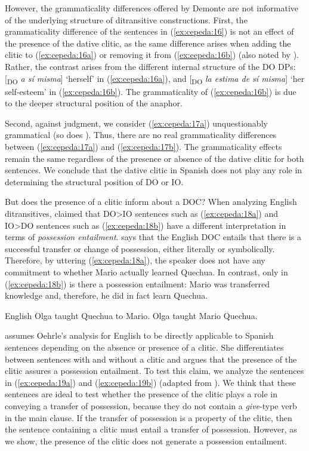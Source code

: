\documentclass[output=paper,colorlinks,citecolor=brown,modfonts,nonflat]{langsci/langscibook}
\begin{document}
However, the grammaticality differences offered by Demonte are not informative of the underlying structure of ditransitive constructions. First, the grammaticality difference of the sentences in (\ref{ex:cepeda:16}) is not an effect of the presence of the dative clitic, as the same difference arises when adding the clitic to (\ref{ex:cepeda:16a}) or removing it from (\ref{ex:cepeda:16b}) (also noted by \citealt{Pineda2013, Pineda2020}). Rather, the contrast arises from the different internal structure of the DO DPs: [\textsubscript{DO} \textit{a sí misma}] ‘herself’ in (\ref{ex:cepeda:16a}), and [\textsubscript{DO} \textit{la estima de sí misma}] ‘her self-esteem’ in (\ref{ex:cepeda:16b}). The grammaticality of (\ref{ex:cepeda:16b}) is due to the deeper structural position of the anaphor.

Second, against  judgment, we consider (\ref{ex:cepeda:17a}) unquestionably grammatical (so does \citealt{Pineda2013,Pineda2020}). Thus, there are no real grammaticality differences between (\ref{ex:cepeda:17a}) and (\ref{ex:cepeda:17b}). The grammaticality effects remain the same regardless of the presence or absence of the dative clitic for both sentences. We conclude that the dative clitic in Spanish does not play any role in determining the structural position of DO or IO.

But does the presence of a clitic inform about a DOC? When analyzing English ditransitives, \citet{Oehrle1976} claimed that DO>IO sentences such as (\ref{ex:cepeda:18a}) and IO>DO sentences such as (\ref{ex:cepeda:18b}) have a different interpretation in terms of \textit{possession entailment}. \citeauthor{Oehrle1976} says that the English DOC entails that there is a successful transfer or change of possession, either literally or symbolically. Therefore, by uttering (\ref{ex:cepeda:18a}), the speaker does not have any commitment to whether Mario actually learned Quechua. In contrast, only in (\ref{ex:cepeda:18b}) is there a possession entailment: Mario was transferred knowledge and, therefore, he did in fact learn Quechua.

\ea%
    \label{ex:cepeda:18} English
	\ea\label{ex:cepeda:18a} Olga taught Quechua to Mario.
	\ex\label{ex:cepeda:18b} Olga taught Mario Quechua.
	\z
\z

\citet{Demonte1995} assumes Oehrle’s analysis for English to be directly applicable to Spanish sentences depending on the absence or presence of a clitic. She differentiates between sentences with and without a clitic and argues that the presence of the clitic assures a possession entailment. To test this claim, we analyze the sentences in (\ref{ex:cepeda:19a}) and (\ref{ex:cepeda:19b}) (adapted from \citeauthor{Demonte1995}). We think that these sentences are ideal to test whether the presence of the clitic plays a role in conveying a transfer of possession, because they do not contain a \textit{give}-type verb in the main clause. If the transfer of possession is a property of the clitic, then the sentence containing a clitic must entail a transfer of possession. However, as we show, the presence of the clitic does not generate a possession entailment.
\end{document}
